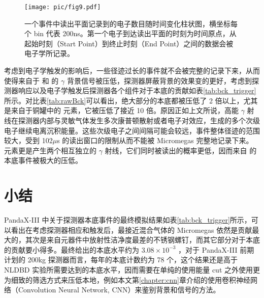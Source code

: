 \begin{figure}
    \centering
    \texttt{[image: pic/fig9.pdf]}
    \caption{一个事件中读出平面记录到的电子数目随时间变化柱状图，横坐标每个 bin 代表 200ns。第一个电子到达读出平面的时刻为时间原点，从起始时刻（Start Point）到终止时刻（End Point）之间的数据会被电子学所记录。}
    \label{fig:trigger}
\end{figure}

考虑到电子学触发的影响后，一些径迹过长的事件就不会被完整的记录下来，从而使得来自于 \utte 和 \thttt 的 $\gamma$ 背景信号被压低，探测器屏蔽背景的效果变的更好，考虑到探测器响应以及电子学触发后探测器各个组件对于本底的贡献如表\ref{tab:bck_trigger}所示。对比表\ref{tab:rawBck}可以看出，绝大部分的本底都被压低了 2 倍以上，尤其是来自于铜罐中的 \cose 元素，它被压低了接近 10 倍。原因正如上文所说，高能 $\gamma$ 射线在探测器内部与灵敏气体发生多次康普顿散射或者电子对效应，生成的多个次级电子继续电离沉积能量。这些次级电子之间间隔可能会较远，事件整体径迹的范围较大，受到 102$\mu$s 的读出窗口的限制从而不能被 Micromegas 完整地记录下来。\cose 元素更是产生两个相互独立的 $\gamma$ 射线，它们同时被读出的概率更低，因而来自 \cose 的本底事件被极大的压低。

\section{小结}

PandaX-III 中关于探测器本底事件的最终模拟结果如表\ref{tab:bck_trigger}所示，可以看出在考虑探测器相应和触发后，最接近混合气体的 Micromegas 依然是贡献最大的，其次是来自元器件中放射性洁净度最差的不锈钢螺钉，而其它部分对于本底的贡献要小得多。最终给出的本底水平约为 $3.08\times 10^{-3}$ \ckky，对于 PandaX-III 前期计划的 200kg 探测器而言，每年的本底计数约为 78 个，这个结果还是高于 NLDBD 实验所需要达到的本底水平，因而需要在单纯的使用能量 cut 之外使用更为细致的筛选方式来压低本地，例如本文第\ref{chapter:cnn}章介绍的使用卷积神经网络（Convolution Neural Network, CNN）来鉴别背景和信号的方法。

